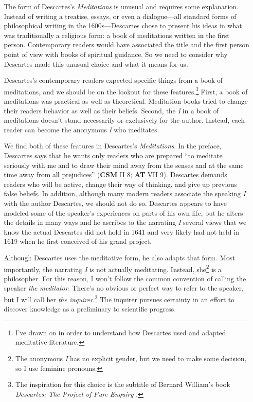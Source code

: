 The form of Descartes's \textit{Meditations} is unusual and requires some explanation. Instead of writing a treatise, essays, or even a dialogue---all standard forms of philosophical writing in the 1600s---Descartes chose to present his ideas in what was traditionally a religious form: a book of meditations written in the first person. Contemporary readers would have associated the title and the first person point of view with books of spiritual guidance. So we need to consider why Descartes made this unusual choice and what it means for us.

Descartes's contemporary readers expected specific things from a book of meditations, and we should be on the lookout for these features.\footnote{I've drawn on \textcites{rorty1986a}{williams1986}{mercer2014} in order to understand how Descartes used and adapted meditative literature.} First, a book of meditations was practical as well as theoretical. Meditation books tried to change their readers behavior as well as their beliefs. Second, the \textit{I} in a book of meditations doesn't stand necessarily or exclusively for the author. Instead, each reader can become the anonymous \textit{I} who meditates.

We find both of these features in Descartes's \textit{Meditations}. In the preface, Descartes says that he wants only readers who are prepared ``to meditate seriously with me and to draw their mind away from the senses and at the same time away from all prejudices'' (\textbf{CSM} II 8; \textbf{AT} VII 9). Descartes demands readers who will be active, change their way of thinking, and give up previous false beliefs. In addition, although many modern readers associate the speaking \textit{I} with the author Descartes, we should not do so. Descartes appears to have modeled some of the speaker's experiences on parts of his own life, but he alters the details in many ways and he ascribes to the narrating \textit{I} several views that we know the actual Descartes did not hold in 1641 and very likely had not held in 1619 when he first conceived of his grand project.

Although Descartes uses the meditative form, he also adapts that form. Most importantly, the narrating \textit{I} is not actually meditating. Instead, she\footnote{The anonymous \textit{I} has no explicit gender, but we need to make some decision, so I use feminine pronouns.} is a philosopher. For this reason, I won't follow the common convention of calling the speaker \textit{the meditator}. There's no obvious or perfect way to refer to the speaker, but I will call her \textit{the inquirer}.\footnote{The inspiration for this choice is the subtitle of Bernard William's book \textit{Descartes: The Project of Pure Enquiry} \parencite{williams1978}.} The inquirer pursues certainty in an effort to discover knowledge as a preliminary to scientific progress.

